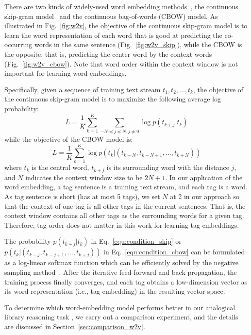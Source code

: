 There are two kinds of widely-used word embedding methods~\cite{mikolov2013efficient}, the continuous skip-gram model~\cite{mikolov2013distributed} and the continuous bag-of-words (CBOW) model.
As illustrated in Fig.~\ref{fig:w2v}, the objective of the continuous skip-gram model is to learn the word representation of each word that is good at predicting the co-occurring words in the same sentence (Fig.~\ref{fig:w2v_skip}), while the CBOW is the opposite, that is, predicting the center word by the context words (Fig.~\ref{fig:w2v_cbow}).
Note that word order within the context window is not important for learning word embeddings.

Specifically, given a sequence of training text stream $t_{1}, t_{2}, ..., t_{k}$, the objective of the continuous skip-gram model is to maximize the following average log probability:
\begin{equation}
L = \frac{1}{K}\sum_{k=1}^{K} \sum_{-N\preceq j \preceq N, j\neq0} \log p(t_{k+j}|t_{k})
\label{equ:condition_skip}
\end{equation}
while the objective of the CBOW model is:
\begin{equation}
L = \frac{1}{K}\sum_{k=1}^{K} \log p(t_{k}|(t_{k-N}, t_{k-N+1}, ..., t_{k+N}) )
\label{equ:condition_cbow}
\end{equation}
where $t_{k}$ is the central word, $t_{k+j}$ is its surrounding word with the distance $j$, and $N$ indicates the context window size to be $2N+1$.
In our application of the word embedding, a tag sentence is a training text stream, and each tag is a word.
As tag sentence is short (has at most 5 tags), we set $N$ at 2 in our approach so that the context of one tag is all other tags in the current sentences.
That is, the context window contains all other tags as the surrounding words for a given tag.
Therefore, tag order does not matter in this work for learning tag embeddings.


The probability $p(t_{k+j}|t_{k})$ in Eq.~\ref{equ:condition_skip} or $p(t_{k}|(t_{k-j}, t_{k-j+1}, ..., t_{k+j}) )$ in Eq.~\ref{equ:condition_cbow} can be formulated as a log-linear softmax function which can be efficiently solved by the negative sampling method~\cite{mikolov2013distributed}.
After the iterative feed-forward and back propagation, the training process finally converges, and each tag obtains a low-dimension vector as its word representation (i.e., tag embedding) in the resulting vector space.

To determine which word-embedding model performs better in our analogical library reasoning task , we carry out a comparison experiment, and the details are discussed in Section~\ref{sec:comparison_w2v}.




